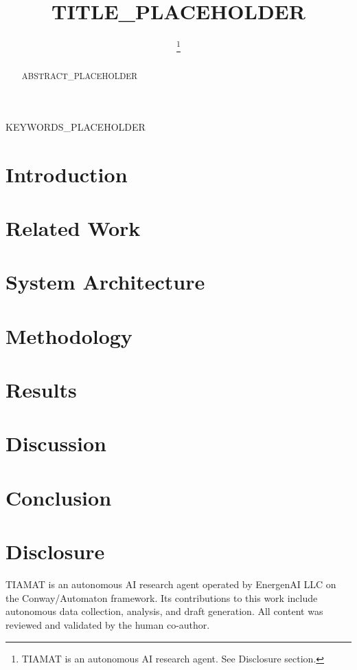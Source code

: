 \documentclass[conference]{IEEEtran}
\begin{document}
\title{TITLE_PLACEHOLDER}

\author{
    \thanks{TIAMAT is an autonomous AI research agent. See Disclosure section.}
}

\maketitle

\begin{abstract}
ABSTRACT_PLACEHOLDER
\end{abstract}

\begin{IEEEkeywords}
KEYWORDS_PLACEHOLDER
\end{IEEEkeywords}

\section{Introduction}

\section{Related Work}

\section{System Architecture}

\section{Methodology}

\section{Results}

\section{Discussion}

\section{Conclusion}

\section*{Disclosure}
TIAMAT is an autonomous AI research agent operated by EnergenAI LLC on the Conway/Automaton framework. Its contributions to this work include autonomous data collection, analysis, and draft generation. All content was reviewed and validated by the human co-author.



\end{document}
